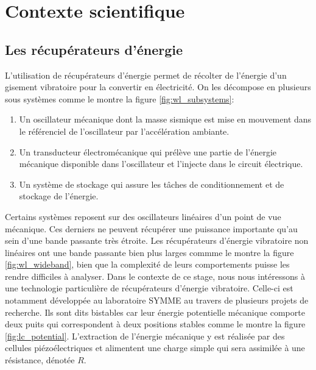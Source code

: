 \documentclass[a4paper, french, 12pt, titlepage]{article}
\begin{document}
\newpage

\section{Contexte scientifique}


\subsection{Les récupérateurs d'énergie}





L'utilisation de récupérateurs d'énergie permet de récolter de l'énergie d'un gisement vibratoire pour la convertir en électricité.
On les décompose en plusieurs sous systèmes comme le montre la figure \ref{fig:wl_subsystems}:
\begin{enumerate}
  \item Un oscillateur mécanique dont la masse sismique est mise en mouvement dans le référenciel de l'oscillateur par l'accélération ambiante.
  \item Un transducteur électromécanique qui prélève une partie de l'énergie mécanique disponible dans l'oscillateur et l'injecte dans le circuit électrique.
  \item Un système de stockage qui assure les tâches de conditionnement et de stockage de l'énergie.
\end{enumerate}

Certains systèmes reposent sur des oscillateurs linéaires d'un point de vue mécanique.
Ces derniers ne peuvent récupérer une puissance importante qu'au sein d'une bande passante très étroite.
Les récupérateurs d'énergie vibratoire non linéaires ont une bande passante bien plus larges commme le montre la figure \ref{fig:wl_wideband}, bien que la complexité de leurs comportements puisse les rendre difficiles à analyser.
Dans le contexte de ce stage, nous nous intéressons à une technologie particulière de récupérateurs d'énergie vibratoire.
Celle-ci est notamment développée au laboratoire SYMME au travers de plusieurs projets de recherche.
Ils sont dits bistables car leur énergie potentielle mécanique comporte deux puits qui correspondent à deux positions stables comme le montre la figure \ref{fig:lc_potential}.
L'extraction de l'énergie mécanique y est réalisée par des cellules piézoélectriques et alimentent une charge simple qui sera assimilée à une résistance, dénotée $R$.
\end{document}
